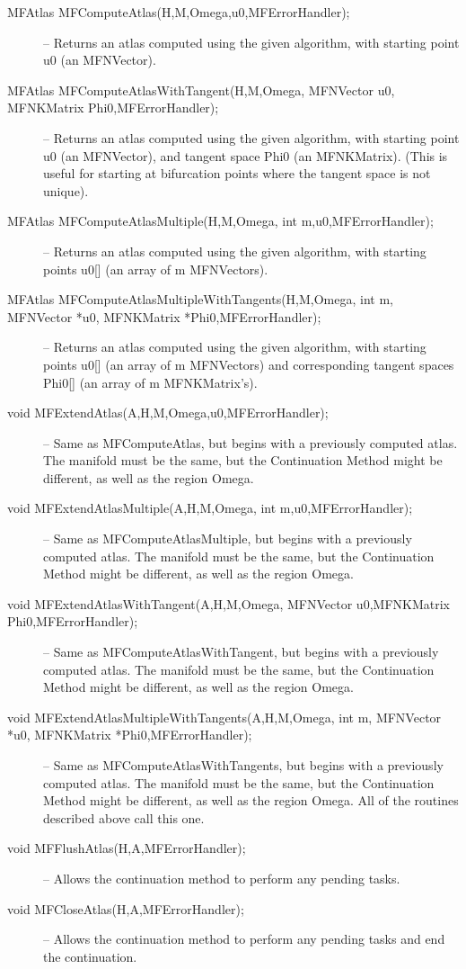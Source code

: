 \documentclass[12pt]{article}
\begin{document}
\begin{description}
\item [MFAtlas MFComputeAtlas(H,M,Omega,u0,MFErrorHandler);]
-- Returns an atlas computed using the given algorithm, with starting point {u0} (an MFNVector).
\item [MFAtlas MFComputeAtlasWithTangent(H,M,Omega, MFNVector u0, MFNKMatrix Phi0,MFErrorHandler);]
-- Returns an atlas computed using the given algorithm, with starting point {u0} (an MFNVector),
and tangent space {Phi0} (an MFNKMatrix). (This is useful for starting at bifurcation points
where the tangent space is not unique).
\item [MFAtlas MFComputeAtlasMultiple(H,M,Omega, int m,u0,MFErrorHandler);]
-- Returns an atlas computed using the given algorithm, with starting points {u0[]} (an array of
m MFNVectors).
\item [MFAtlas MFComputeAtlasMultipleWithTangents(H,M,Omega, int m, MFNVector *u0, MFNKMatrix *Phi0,MFErrorHandler);]
-- Returns an atlas computed using the given algorithm, with starting points {u0[]} (an array of
m MFNVectors) and corresponding tangent spaces {Phi0[]} (an array of m MFNKMatrix's).
\item [void MFExtendAtlas(A,H,M,Omega,u0,MFErrorHandler);]
-- Same as MFComputeAtlas, but begins with a previously computed atlas. The manifold must be the same,
but the Continuation Method might be different, as well as the region Omega. 
\item [void MFExtendAtlasMultiple(A,H,M,Omega, int m,u0,MFErrorHandler);]
-- Same as MFComputeAtlasMultiple, but begins with a previously computed atlas. The manifold must be the same,
but the Continuation Method might be different, as well as the region Omega. 
\item [void MFExtendAtlasWithTangent(A,H,M,Omega, MFNVector u0,MFNKMatrix Phi0,MFErrorHandler);]
-- Same as MFComputeAtlasWithTangent, but begins with a previously computed atlas. The manifold must be the same,
but the Continuation Method might be different, as well as the region Omega. 
\item [void MFExtendAtlasMultipleWithTangents(A,H,M,Omega, int m, MFNVector *u0, MFNKMatrix *Phi0,MFErrorHandler);]
-- Same as MFComputeAtlasWithTangents, but begins with a previously computed atlas. The manifold must be the same,
but the Continuation Method might be different, as well as the region Omega. All of the routines
described above call this one.
\item [void MFFlushAtlas(H,A,MFErrorHandler);]
-- Allows the continuation method to perform any pending tasks.
\item [void MFCloseAtlas(H,A,MFErrorHandler);]
-- Allows the continuation method to perform any pending tasks and end the continuation.
\end{description}
\end{document}
